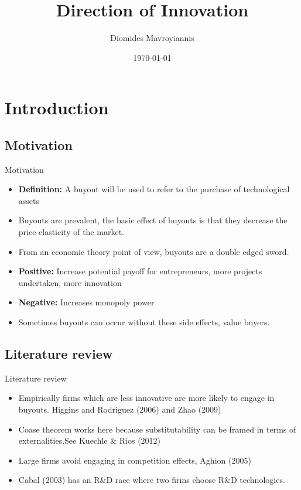 \documentclass{beamer}
\title[Direction of innovation]{Direction of Innovation} %
\author{Diomides Mavroyiannis} %
\institute[Paris Dauphine] %
{
PSL/Paris Dauphine \\ %
\medskip%
}
\date{\today}
\numberwithin{equation}{section}
\begin{document}
\begin{frame}
\titlepage %
\end{frame}


\section{Introduction}
\subsection{Motivation}
\begin{frame}{Motivation}
\begin{itemize}
    \item \textbf{Definition:} A buyout will be used to refer to the purchase of technological assets
    \item Buyouts are prevalent, the basic effect of buyouts is that they decrease the price elasticity of the market.  
    \item From an economic theory point of view, buyouts are a double edged sword.  
    \item \textbf{Positive:} Increase potential payoff for entrepreneurs, more projects undertaken, more innovation
    \item \textbf{Negative:} Increases monopoly power
    \item Sometimes buyouts can occur without these side effects, value buyers. 
\end{itemize}
\end{frame}

\subsection{Literature review}


\begin{frame}{Literature review}
\begin{itemize}
    \item Empirically firms which are less innovative are more likely to engage in buyouts. Higgins and Rodriguez (2006) and Zhao (2009)
    \item Coase theorem works here because substitutability can be framed in terms of externalities.See Kuechle $\&$ Rios  (2012)
    \item Large firms avoid engaging in competition effects, Aghion (2005)
    \item Cabal (2003) has an R$\&$D race where two firms choose R$\&$D technologies. 
\end{itemize}
\end{frame}
\end{document}
